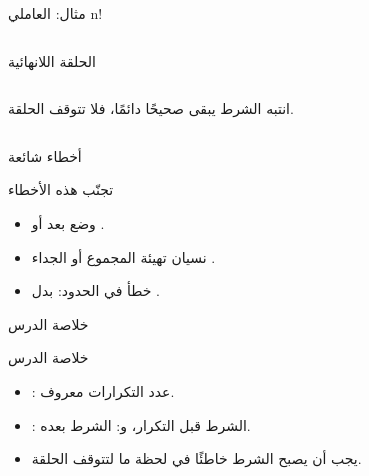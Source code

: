 \documentclass[aspectratio=169, 11pt, t, xcolor={table}]{beamer}
\begin{document}
\begin{frame}{مثال: العاملي \textenglish{n!}}
    \begin{columns}[T]
    \end{columns}
    \vspace{0.2cm}
\end{frame}

\begin{frame}{الحلقة اللانهائية}
    \begin{columns}[T]
        \begin{obox}{\faExclamationTriangle\quad انتبه}
            الشرط يبقى صحيحًا دائمًا، فلا تتوقف الحلقة.
        \end{obox}
    \end{columns}
\end{frame}



\begin{frame}{أخطاء شائعة}
    \begin{obox}{\faExclamationTriangle\quad تجنّب هذه الأخطاء}
        \begin{itemize}
            \item وضع \code{;} بعد  أو .
            \item نسيان تهيئة المجموع  أو الجداء .
            \item خطأ في الحدود:  بدل .
        \end{itemize}
    \end{obox}
\end{frame}

\begin{frame}{خلاصة الدرس}
    \begin{tbox}{\faCheckCircle\quad خلاصة الدرس}
        \begin{itemize}
            \item {}: عدد التكرارات معروف.
            \item {}: الشرط قبل التكرار، و: الشرط بعده.
            \item يجب أن يصبح الشرط خاطئًا في لحظة ما لتتوقف الحلقة.
        \end{itemize}
    \end{tbox}
\end{frame}
\end{document}
